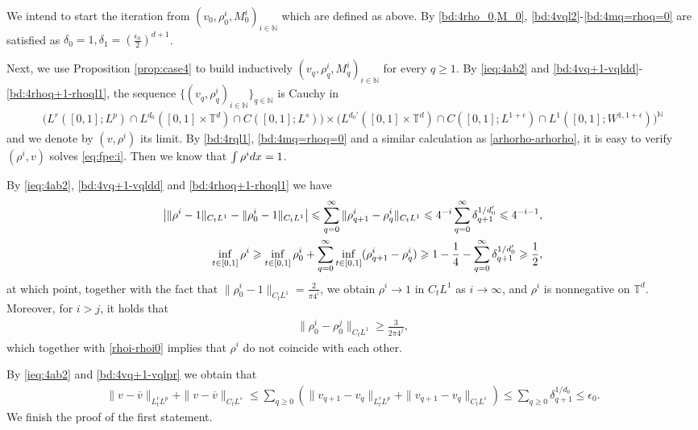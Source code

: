 \documentclass[10pt,a4paper]{amsart}
\numberwithin{equation}{section}
\def\({{\Big(}}
\def\){{\Big)}}
\def\dif{{\mathord{{\rm d}}}}
\def\mN{{\mathbb N}}
\def\mT{{\mathbb T}}
\def\geq{\geqslant}
\def\leq{\leqslant}
\def\({{\Big(}}
\def\){{\Big)}}
\def\dif{{\mathord{{\rm d}}}}
\def\geq{\geqslant}
\def\leq{\leqslant}
\def\N{\mathbb N} \def\kk{\zeta} \def\m{{\bf m}}
\begin{document}
We intend to start the iteration from 
$(v_0, \rho^{i}_0,  M^{i}_0)_{i\in\mN}$ which are defined as above. 
By \eqref{bd:4rho_0,M_0},  \eqref{bd:4vql2}-\eqref{bd:4mq=rhoq=0} are satisfied as $\delta_0=1,\delta_1=(\frac{\epsilon_0}{2})^{d+1}$.


Next, we use Proposition \ref{prop:case4} to build inductively $(v_q,\rho^{i}_q, M^{i}_q)_{i\in\mN}$ for every $q \geq 1$. By \eqref{ieq:4ab2} and \eqref{bd:4vq+1-vqldd}-\eqref{bd:4rhoq+1-rhoql1}, the sequence $\{(v_q,\rho^{i}_q)_{i\in\mN}\}_{q\in \N}$ is
Cauchy in 
\begin{align*}
    \(L^r([0,1];L^p)\cap L^{d_0}([0,1]\times \mT^d)\cap C([0,1];L^s)\)\times \(L^{d_0'}([0,1]\times \mT^d)\cap C([0,1];L^{1+\epsilon})\cap L^1([0,1];W^{1,1+\epsilon})\)^{\mN}\end{align*}
     and we denote by $(v,\rho^{i})$ its limit.    
By \eqref{bd:4rql1}, \eqref{bd:4mq=rhoq=0} and a similar calculation as \eqref{arhorho-arhorho}, it is easy to verify $(\rho^{i},v)$  solves   \eqref{eq:fpe:i}.  Then we know that $\int \rho^{i}\dif x=1$.
      
   

 By \eqref{ieq:4ab2}, \eqref{bd:4vq+1-vqldd} and \eqref{bd:4rhoq+1-rhoql1} we have
\begin{align} 
 \left|   \|\rho^i-1\|_{C_tL^1}- \| \rho^{i}_0-1\|_{C_tL^1}\right|\leq \sum_{q=0}^\infty\|\rho^{i}_{q+1}-\rho^{i}_{q}\|_{C_tL^1}\leq
4^{-i}\sum_{q=0}^\infty\delta_{q+1}^{1/{d_0'}}\leq 4^{-i-1},\label{rhoi-rhoi0}\\
\inf_{t\in [0,1]}\rho^i \geq \inf_{t\in [0,1]} \rho_0^i +
\sum_{q=0}^\infty \inf_{t\in [0,1]}(\rho_{q+1}^i- \rho_q^i) \geq1-\frac14-\sum_{q=0}^\infty \delta_{q+1}^{1/d_0'}\geq \frac12,\notag
\end{align}
at which point, together with the fact that $\| \rho^{i}_0-1\|_{C_tL^1}=\frac{2}{\pi4^i}$, we obtain $\rho^i\to 1$ in $ C_tL^1$ as $i\to\infty$, and  
 $\rho^{i}$ is nonnegative on $\mathbb{T}^d$. Moreover, for $i>j$, it holds that 
 \begin{align*}
     \| \rho^{i}_0-\rho^{j}_0\|_{C_tL^1}\geq \frac{3}{2\pi4^j},
 \end{align*}
 which together with \eqref{rhoi-rhoi0} implies that $\rho^i$
 do not coincide with each other. 

 By \eqref{ieq:4ab2} and \eqref{bd:4vq+1-vqlpr} we obtain that  \begin{align*}
    \|v -\overline v \|_{L^{r}_tL^{p}}+\|v -\overline v \|_{C_tL^s}\leq  \sum_{q\geq0}( \|v_{q+1}-v_{q}\|_{L^{r}_tL^{p}}+\|v_{q+1}-v_q\|_{C_tL^s})\leq
\sum_{q\geq0}\delta_{q+1}^{1/d_0}\leq\epsilon_0.
\end{align*}
 We finish the proof of the first statement. 
\end{document}
